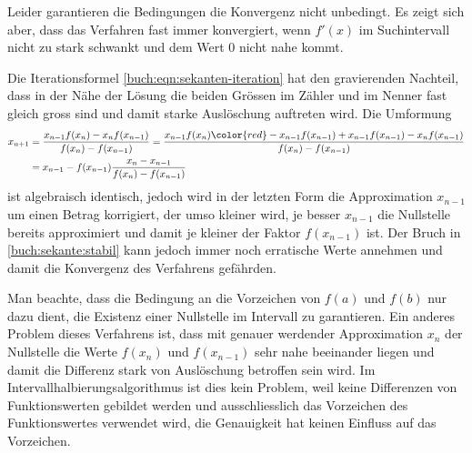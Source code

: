 %

Leider garantieren die Bedingungen die Konvergenz nicht unbedingt.
Es zeigt sich aber, dass das Verfahren fast immer konvergiert, wenn
$f'(x)$ im Suchintervall nicht zu stark schwankt und dem Wert $0$
nicht nahe kommt.

Die Iterationsformel \eqref{buch:eqn:sekanten-iteration} hat den
gravierenden Nachteil, dass in der Nähe der Lösung die beiden
Grössen im Zähler und im Nenner fast gleich gross sind und damit
starke Auslöschung auftreten wird.
%
Die Umformung
\begin{align}
x_{n+1}
&=
\frac{x_{n-1}f(x_{n})-x_{n}f(x_{n-1})}{f(x_n)-f(x_{n-1})}
=
\frac{x_{n-1}f(x_{n})
{\color{red}\mathstrut -x_{n-1}f(x_{n-1})+x_{n-1}f(x_{n-1})}
-x_{n}f(x_{n-1})}{f(x_n)-f(x_{n-1})}
\\
&=x_{n-1} - f(x_{n-1})\frac{x_n-x_{n-1}}{f(x_n)-f(x_{n-1})}
\label{buch:sekante:stabil}
\end{align}
ist algebraisch identisch, jedoch wird in der letzten Form die Approximation
$x_{n-1}$ um einen Betrag korrigiert, der umso kleiner wird, je besser
$x_{n-1}$ die Nullstelle bereits approximiert und damit je kleiner
der Faktor $f(x_{n-1})$ ist.
Der Bruch in \eqref{buch:sekante:stabil} kann jedoch immer noch
erratische Werte annehmen und damit die Konvergenz des Verfahrens
gefährden.
%
%

Man beachte, dass die Bedingung an die Vorzeichen von $f(a)$ und $f(b)$
nur dazu dient, die Existenz einer Nullstelle im Intervall zu garantieren.
Ein anderes Problem dieses Verfahrens ist, dass mit genauer werdender
Approximation $x_n$ der Nullstelle die Werte $f(x_n)$ und $f(x_{n-1})$
sehr nahe beeinander liegen und damit die Differenz stark von 
Auslöschung betroffen sein wird.
Im Intervallhalbierungsalgorithmus ist dies kein Problem, weil keine
Differenzen von Funktionswerten gebildet werden und ausschliesslich das
Vorzeichen des Funktionswertes verwendet wird, die Genauigkeit hat
keinen Einfluss auf das Vorzeichen.
%



